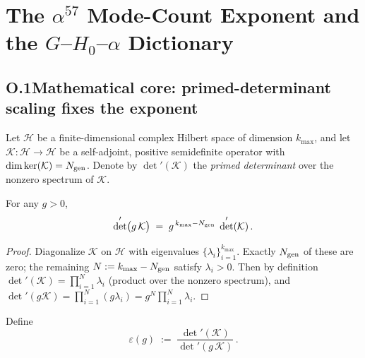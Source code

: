 
%

\section{The $\alpha^{57}$ Mode-Count Exponent and the $G$--$H_0$--$\alpha$ Dictionary}
\label{app:O_alpha57_clean}

\subsection{O.1\quad Mathematical core: primed-determinant scaling fixes the exponent}
Let $\mathcal{H}$ be a finite-dimensional complex Hilbert space of dimension $k_{\max}$, and let
$\mathcal{K}:\mathcal{H}\to\mathcal{H}$ be a self-adjoint, positive semidefinite operator with
$\dim\ker(\mathcal{K})=N_{\rm gen}$.
Denote by $\det'(\mathcal{K})$ the \emph{primed determinant} over the nonzero spectrum of $\mathcal{K}$.

\begin{lemma}
\label{lem:O_det_scaling}
For any $g>0$,
\begin{equation}
\det'\!\big(g\,\mathcal{K}\big)\;=\; g^{\,k_{\max}-N_{\rm gen}}\;\det'(\mathcal{K})\,.
\end{equation}
\end{lemma}

\begin{proof}
Diagonalize $\mathcal{K}$ on $\mathcal{H}$ with eigenvalues $\{\lambda_i\}_{i=1}^{k_{\max}}$.
Exactly $N_{\rm gen}$ of these are zero; the remaining $N:=k_{\max}-N_{\rm gen}$ satisfy $\lambda_i>0$.
Then by definition $\det'(\mathcal{K})=\prod_{i=1}^{N}\lambda_i$ (product over the nonzero spectrum), and
$\det'(g\mathcal{K})=\prod_{i=1}^{N}(g\lambda_i)=g^{N}\prod_{i=1}^{N}\lambda_i$.
\end{proof}

\begin{definition}
\label{def:O_eps}
Define
\begin{equation}
\varepsilon(g)\;:=\;\frac{\det'(\mathcal{K})}{\det'(g\,\mathcal{K})}\,.
\end{equation}
\end{definition}


